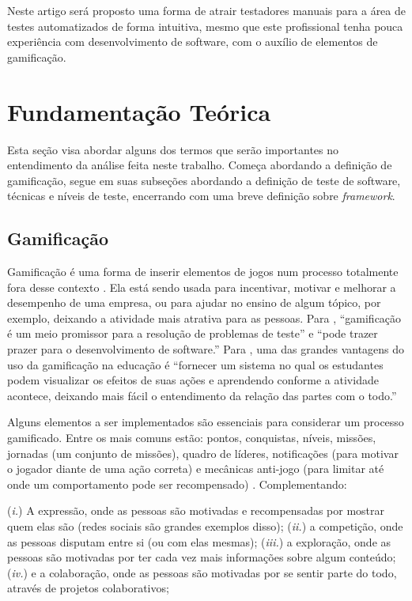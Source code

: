 \documentclass[twoside,english,brazilian]{UNISINOSartigo}
\begin{document}
Neste artigo será proposto uma forma de atrair testadores manuais para a área de testes automatizados de forma intuitiva, mesmo que este profissional tenha pouca experiência com desenvolvimento de software, com o auxílio de elementos de gamificação.


 


\section{Fundamentação Teórica}

Esta seção visa abordar alguns dos termos que serão importantes no entendimento da análise feita neste trabalho. Começa abordando a definição de gamificação, segue em suas subseções abordando a definição de teste de software, técnicas e níveis de teste, encerrando com uma breve definição sobre \textit{framework}.

\subsection{Gamificação}

Gamificação é uma forma de inserir elementos de jogos num processo totalmente fora desse contexto \cite{Dale}. Ela está sendo usada para incentivar, motivar e melhorar a desempenho de uma empresa, ou para ajudar no ensino de algum tópico, por exemplo, deixando a atividade mais atrativa para as pessoas. Para \cite{DeJesus}, ``gamificação é um meio promissor para a resolução de problemas de teste'' e ``pode trazer prazer para o desenvolvimento de software.'' Para \cite{Elgrably}, uma das grandes vantagens do uso da gamificação na educação é ``fornecer um sistema no qual os estudantes podem visualizar os efeitos de suas ações e aprendendo conforme a atividade acontece, deixando mais fácil o entendimento da relação das partes com o todo.'' 

Alguns elementos a ser implementados são essenciais para considerar um processo gamificado. Entre os mais comuns estão: pontos, conquistas, níveis, missões, jornadas (um conjunto de missões), quadro de líderes, notificações (para motivar o jogador diante de uma ação correta) e mecânicas anti-jogo (para limitar até onde um comportamento pode ser recompensado) \cite{Dale}. Complementando:

(\textit{i.}) A expressão, onde as pessoas são motivadas e recompensadas por mostrar quem elas são (redes sociais são grandes exemplos disso); (\textit{ii.}) a competição, onde as pessoas disputam entre si (ou com elas mesmas); (\textit{iii.}) a exploração, onde as pessoas são motivadas por ter cada vez mais informações sobre algum conteúdo; (\textit{iv.}) e a colaboração, onde as pessoas são motivadas por se sentir parte do todo, através de projetos colaborativos;
\end{document}
